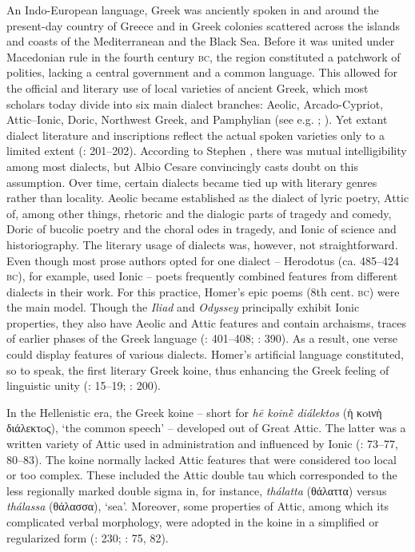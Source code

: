 An Indo-European language, Greek was anciently spoken in and around the present-day country of Greece and in Greek colonies scattered across the islands and coasts of the Mediterranean and the Black Sea. Before it was united under Macedonian rule in the fourth century \textsc{bc}, the region constituted a patchwork of polities, lacking a central government and a common language. This allowed for the official and literary use of local varieties of ancient Greek, which most scholars today divide into six main dialect branches: Aeolic, Arcado-Cypriot, Attic–Ionic, Doric, Northwest Greek, and Pamphylian (see e.g. \citealt{Colvin2010}; \citealt{Finkelberg2014}). Yet extant dialect literature and inscriptions reflect the actual spoken varieties only to a limited extent (\citealt{Colvin2010}: 201–202). According to Stephen \citet[300, 303]{Colvin1999}, there was mutual intelligibility among most dialects, but Albio Cesare \citet[4-5]{Cassio2016} convincingly casts doubt on this assumption. Over time, certain dialects became tied up with literary genres rather than locality. Aeolic became established as the dialect of lyric poetry, Attic of, among other things, rhetoric and the dialogic parts of tragedy and comedy, Doric of bucolic poetry and the choral odes in tragedy, and Ionic of science and historiography. The literary usage of dialects was, however, not straightforward. Even though most prose authors opted for one dialect – Herodotus (ca. 485–424 \textsc{bc}), for example, used Ionic – poets frequently combined features from different dialects in their work. For this practice, Homer’s epic poems (8th cent. \textsc{bc}) were the main model. Though the \textit{Iliad} and \textit{Odyssey} principally exhibit Ionic properties, they also have Aeolic and Attic features and contain archaisms, traces of earlier phases of the Greek language (\citealt{Hackstein2010}: 401–408; \citealt{Tribulato2010}: 390). As a result, one verse could display features of various dialects. Homer’s artificial language constituted, so to speak, the first literary Greek koine, thus enhancing the Greek feeling of linguistic unity (\citealt{Morpurgo1987}: 15–19; \citealt{Colvin2010}: 200).

In the Hellenistic era, the Greek koine – short for \textit{hē koinḕ diálektos} (ἡ κoινὴ διάλεκτoς), ‘the common speech’ – developed out of Great Attic. The latter was a written variety of Attic used in administration and influenced by Ionic (\citealt{Horrocks2010}: 73–77, 80–83). The koine normally lacked Attic features that were considered too local or too complex. These included the Attic double tau which corresponded to the less regionally marked double sigma in, for instance, \textit{thálatta} (θάλαττα) versus \textit{thálassa} (θάλασσα), ‘sea’. Moreover, some properties of Attic, among which its complicated verbal morphology, were adopted in the koine in a simplified or regularized form (\citealt{Brixhe2010}: 230; \citealt{Horrocks2010}: 75, 82).

